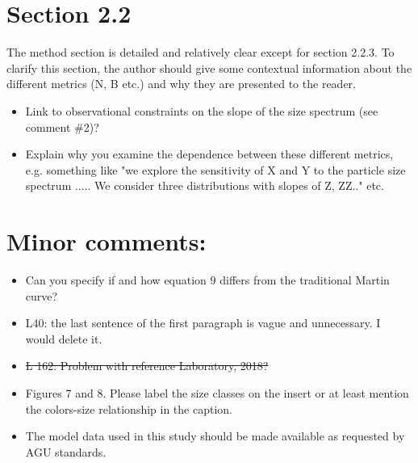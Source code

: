 \documentclass[article,linenumbers]{agujournal2018}
\begin{document}
	
	\section*{Section 2.2}
	The method section is detailed and relatively clear except for section 2.2.3. To clarify this section, the author should give some contextual information about the different metrics (N, B etc.) and why they are presented to the reader. 
	\begin{itemize}
			\item Link to observational constraints on the slope of the size spectrum (see comment \#2)?
	
	\item Explain why you examine the dependence between these different metrics, e.g. something like "we explore the sensitivity of X and Y to the particle size spectrum ..... We consider three distributions with slopes of Z, ZZ.." etc.
		\end{itemize}
	
	
	\section*{Minor comments:}
	\begin{itemize}	
	\item Can you specify if and how equation 9 differs from the traditional Martin curve?
	
	\item L40: the last sentence of the first paragraph is vague and unnecessary. I would delete it.
	\item \color{black}\sout{L 162: Problem with reference Laboratory, 2018?}\color{red}
	
	\item Figures 7 and 8. Please label the size classes on the insert or at least mention the colors-size relationship in the caption.
	
	\item The model data used in this study should be made available as requested by AGU standards.
		\end{itemize}
		
\end{document}
